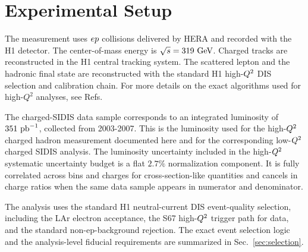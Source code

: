 \section{Experimental Setup}
\label{sec:experimental_setup}

The measurement uses $ep$ collisions delivered by HERA and recorded with the
H1 detector.  The center-of-mass energy is $\sqrt{s}=319~\text{GeV}$.  Charged tracks are
reconstructed in the H1 central tracking system. The scattered lepton and the
hadronic final state are reconstructed with the standard H1 high-$Q^{2}$ DIS
selection and calibration chain. For more details on the exact algorithms used for high-$Q^2$ analyses, see Refs.~\cite{Kogler:2011zz,Britzger:2013,Peez:2005Hadroo2}

The charged-SIDIS data sample corresponds to an integrated luminosity of
$351~\text{pb}^{-1}$, collected from 2003-2007. This is the luminosity used for the high-$Q^{2}$ charged
hadron measurement documented here and for the corresponding low-$Q^{2}$ charged
SIDIS analysis.  The luminosity uncertainty included in the high-$Q^{2}$ systematic uncertainty budget is a flat $2.7\%$ normalization component.  It is fully
correlated across bins and charges for cross-section-like quantities and cancels
in charge ratios when the same data sample appears in numerator and denominator.

The analysis uses the standard H1 neutral-current DIS event-quality selection,
including the LAr electron acceptance, the S67 high-$Q^{2}$ trigger path for data,
and the standard non-ep-background rejection. The exact event selection logic and the
analysis-level fiducial requirements are summarized in Sec.~\ref{sec:selection}.
